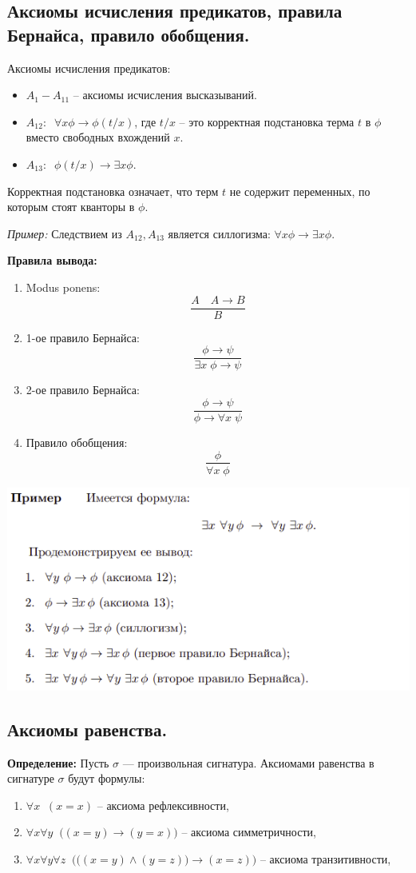 \subsection{Аксиомы исчисления предикатов, правила Бернайса, правило обобщения.}
Аксиомы исчисления предикатов:
\begin{itemize}
    \item $A_1-A_{11}$ -- аксиомы исчисления высказываний.
    \item $A_{12}: \;\; \forall x \phi \to \phi(t/x)$,  где $t/x$ -- это корректная подстановка терма $t$ в $\phi$ вместо свободных вхождений $x$. 
    \item $A_{13}: \;\; \phi(t/x) \to \exists x \phi$.
\end{itemize}
Корректная подстановка означает, что терм $t$ не содержит переменных, по которым стоят кванторы в $\phi$.

\textit{Пример:} Следствием из $A_{12},A_{13}$ является силлогизма: $\forall x \phi \to \exists x \phi$.

\textbf{Правила вывода:}
\begin{enumerate}
    \item Modus ponens: $$\frac{A\quad A\to B}{B}$$
    \item 1-ое правило Бернайса: $$\frac{\phi\to\psi}{\exists x \; \phi\to\psi}$$
    \item 2-ое правило Бернайса: $$\frac{\phi\to\psi}{ \phi\to\forall x \;\psi}$$
    \item Правило обобщения: $$\frac{\phi}{\forall x \;\phi}$$
\end{enumerate}

\label{exist_x_forall_y}
\includegraphics[width=0.65\linewidth]{images/1_definitions_sillog.png}

\subsection{Аксиомы равенства.}
\textbf{Определение:} Пусть $\sigma$ — произвольная сигнатура. Аксиомами равенства в сигнатуре $\sigma$ будут формулы:
\begin{enumerate}
    \item $\forall x \;\; (x=x)$ -- аксиома рефлексивности,
    \item $\forall x \forall y \;\;  \big((x=y)\to(y=x)\big)$ -- аксиома симметричности,
    \item $\forall x \forall y \forall z\;\;  \big(\big((x=y)\land(y=z)\big)\to(x=z)\big)$ -- аксиома транзитивности,
\end{enumerate}


